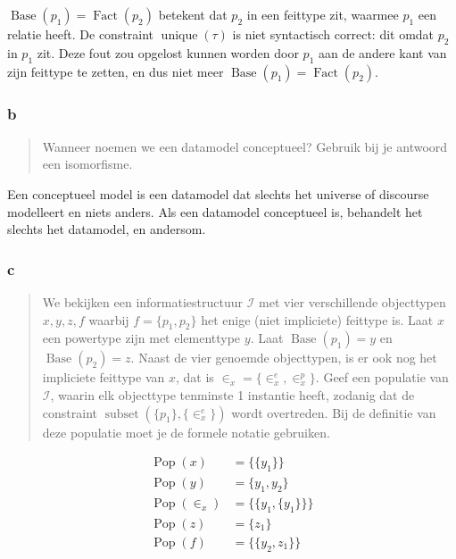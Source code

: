 \documentclass[10pt]{article}
\newcommand{\Base}{\ensuremath{\operatorname{Base}}}
\newcommand{\Fact}{\ensuremath{\operatorname{Fact}}}
\newcommand{\unique}{\ensuremath{\operatorname{unique}}}
\newcommand{\Pop}{\ensuremath{\operatorname{Pop}}}
\newcommand{\I}{\ensuremath{\mathcal{I}}}
\begin{document}
$\Base(p_1) = \Fact(p_2)$ betekent dat $p_2$ in een feittype zit, waarmee $p_1$
een relatie heeft. De constraint $\unique(\tau)$ is niet syntactisch correct:
dit omdat $p_2$ in $p_1$ zit. Deze fout zou opgelost kunnen worden door $p_1$
aan de andere kant van zijn feittype te zetten, en dus niet meer $\Base(p_1)
= \Fact(p_2)$.

\subsubsection{b}

\begin{quote}
  Wanneer noemen we een datamodel conceptueel? Gebruik bij je antwoord een 
  isomorfisme. \cite{tentamen2011}
\end{quote}

Een conceptueel model is een datamodel dat slechts het universe of discourse
modelleert en niets anders. Als een datamodel conceptueel is, behandelt het 
slechts het datamodel, en andersom.

\subsubsection{c}

\begin{quote}
  
  We bekijken een informatiestructuur $\I$ met vier verschillende objecttypen
  $x, y, z, f$ waarbij $f=\{p_1,p_2\}$ het enige (niet impliciete) feittype is.
  Laat $x$ een powertype zijn met elementtype $y$. Laat $\Base(p_1) = y$ en
  $\Base(p_2) = z$. Naast de vier genoemde objecttypen, is er ook nog het
  impliciete feittype van $x$, dat is $\in_x = \{\in^e_x, \in^p_x\}$. Geef een
  populatie van $\I$, waarin elk objecttype tenminste
  1 instantie heeft, zodanig dat de constraint
  $\operatorname{subset}(\{p_1\},\{\in^e_x\})$ wordt overtreden. Bij de definitie
  van deze populatie moet je de formele notatie gebruiken. \cite{tentamen2011}

\end{quote}

\begin{align*}
  \Pop(x)     & = \{\{y_1\}\}            \\ 
  \Pop(y)     & = \{y_1, y_2\}           \\ 
  \Pop(\in_x) & = \{ \{y_1, \{y_1\} \}\} \\ 
  \Pop(z)     & = \{z_1\}                \\ 
  \Pop(f)     & = \{ \{y_2, z_1\} \}     \\ 
\end{align*}
\end{document}
